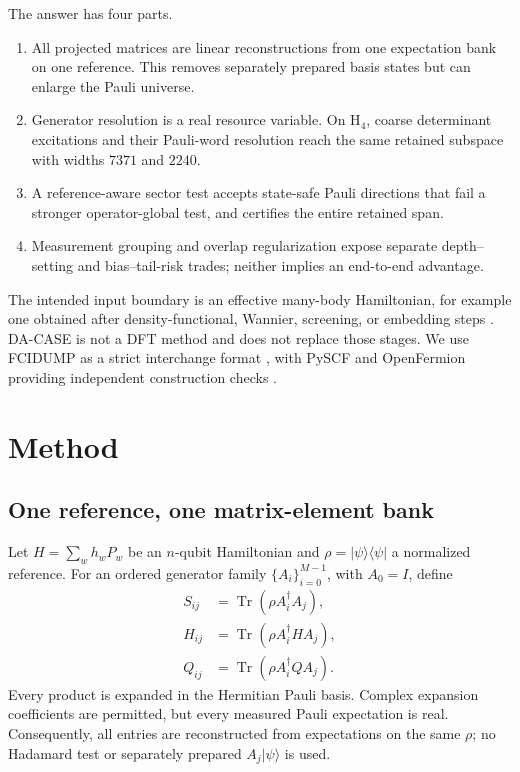 \documentclass[aps,pra,reprint,superscriptaddress,nofootinbib,floatfix]{revtex4-2}
\newcommand{\Tr}{\operatorname{Tr}}
\newcommand{\ket}[1]{\lvert #1\rangle}
\newcommand{\bra}[1]{\langle #1\rvert}
\begin{document}
The answer has four parts.
\begin{enumerate}
 \item All projected matrices are linear reconstructions from one expectation
 bank on one reference.  This removes separately prepared basis states but can
 enlarge the Pauli universe.
 \item Generator resolution is a real resource variable.  On H$_4$, coarse
 determinant excitations and their Pauli-word resolution reach the same
 retained subspace with widths \(7371\) and \(2240\).
 \item A reference-aware sector test accepts state-safe Pauli directions that
 fail a stronger operator-global test, and certifies the entire retained span.
 \item Measurement grouping and overlap regularization expose separate
 depth--setting and bias--tail-risk trades; neither implies an end-to-end
 advantage.
\end{enumerate}

The intended input boundary is an effective many-body Hamiltonian, for example
one obtained after density-functional, Wannier, screening, or embedding steps
\cite{marzari2012wannier,pizzi2020wannier90,aryasetiawan2004crpa,
georges1996dmft}.  DA-CASE is not a DFT method and does not replace those
stages.  We use FCIDUMP as a strict interchange format
\cite{knowles1989fcidump}, with PySCF and OpenFermion providing independent
construction checks \cite{sun2018pyscf,mcclean2020openfermion}.

\section{Method}
\label{sec:method}

\subsection{One reference, one matrix-element bank}
\label{sec:bank}

Let \(H=\sum_w h_w P_w\) be an \(n\)-qubit Hamiltonian and
\(\rho=\ket{\psi}\bra{\psi}\) a normalized reference.  For an ordered
generator family \(\{A_i\}_{i=0}^{M-1}\), with \(A_0=I\), define
\begin{align}
 S_{ij} &= \Tr(\rho A_i^\dagger A_j), \label{eq:s}\\
 H_{ij} &= \Tr(\rho A_i^\dagger H A_j), \label{eq:h}\\
 Q_{ij} &= \Tr(\rho A_i^\dagger Q A_j). \label{eq:q}
\end{align}
Every product is expanded in the Hermitian Pauli basis.  Complex expansion
coefficients are permitted, but every measured Pauli expectation is real.
Consequently, all entries are reconstructed from expectations on the same
\(\rho\); no Hadamard test or separately prepared \(A_j\ket{\psi}\) is used.
\end{document}
